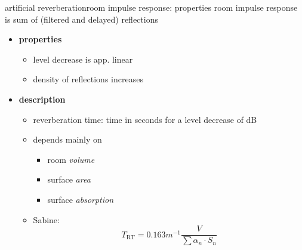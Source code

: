 \begin{frame}{artificial reverberation}{room impulse response: properties}
	\vspace{-5mm}
    room impulse response is sum of (filtered and delayed) reflections
	\pause
	
	\begin{itemize}
		\item	\textbf{properties}
			\begin{itemize}
				\item	level decrease is app. linear
				\item	density of reflections increases
			\end{itemize}
		\pause
        \bigskip
		\item	\textbf{description}
			\begin{itemize}
				\item	reverberation time: time in seconds for a level decrease of \unit[60]{dB}
				\item	depends mainly on
					\begin{itemize}
						\item	room \textit{volume}
						\item	surface \textit{area}
						\item	surface \textit{absorption}
					\end{itemize}
				\item	Sabine:
					\begin{equation*}
						T_\mathrm{RT} = 0.163 \unit{m^{-1}} \frac{V}{\sum{\alpha_n\cdot S_n}}
					\end{equation*}
			\end{itemize}
	\end{itemize}
\end{frame}

